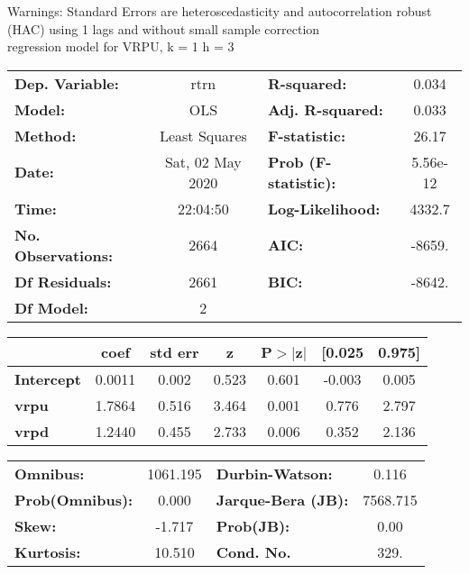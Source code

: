 Warnings: \newline
 [1] Standard Errors are heteroscedasticity and autocorrelation robust (HAC) using 1 lags and without small sample correction\\ 

regression model for VRPU, k = 1 h = 3\begin{center}
\begin{tabular}{lclc}
\toprule
\textbf{Dep. Variable:}    &       rtrn       & \textbf{  R-squared:         } &     0.034   \\
\textbf{Model:}            &       OLS        & \textbf{  Adj. R-squared:    } &     0.033   \\
\textbf{Method:}           &  Least Squares   & \textbf{  F-statistic:       } &     26.17   \\
\textbf{Date:}             & Sat, 02 May 2020 & \textbf{  Prob (F-statistic):} &  5.56e-12   \\
\textbf{Time:}             &     22:04:50     & \textbf{  Log-Likelihood:    } &    4332.7   \\
\textbf{No. Observations:} &        2664      & \textbf{  AIC:               } &    -8659.   \\
\textbf{Df Residuals:}     &        2661      & \textbf{  BIC:               } &    -8642.   \\
\textbf{Df Model:}         &           2      & \textbf{                     } &             \\
\bottomrule
\end{tabular}
\begin{tabular}{lcccccc}
                   & \textbf{coef} & \textbf{std err} & \textbf{z} & \textbf{P$> |$z$|$} & \textbf{[0.025} & \textbf{0.975]}  \\
\midrule
\textbf{Intercept} &       0.0011  &        0.002     &     0.523  &         0.601        &       -0.003    &        0.005     \\
\textbf{vrpu}      &       1.7864  &        0.516     &     3.464  &         0.001        &        0.776    &        2.797     \\
\textbf{vrpd}      &       1.2440  &        0.455     &     2.733  &         0.006        &        0.352    &        2.136     \\
\bottomrule
\end{tabular}
\begin{tabular}{lclc}
\textbf{Omnibus:}       & 1061.195 & \textbf{  Durbin-Watson:     } &    0.116  \\
\textbf{Prob(Omnibus):} &   0.000  & \textbf{  Jarque-Bera (JB):  } & 7568.715  \\
\textbf{Skew:}          &  -1.717  & \textbf{  Prob(JB):          } &     0.00  \\
\textbf{Kurtosis:}      &  10.510  & \textbf{  Cond. No.          } &     329.  \\
\bottomrule
\end{tabular}
\end{center}


